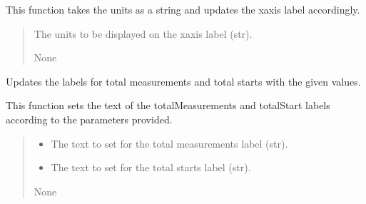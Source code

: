 \documentclass[letterpaper,10pt,english]{sphinxmanual}
\begin{document}
\begin{fulllineitems}
\begin{fulllineitems}
\sphinxAtStartPar
This function takes the units as a string and updates the x\sphinxhyphen{}axis label accordingly.
\begin{quote}\begin{description}
\sphinxAtStartPar
{} \textendash{} The units to be displayed on the x\sphinxhyphen{}axis label (str).

\sphinxAtStartPar
None

\end{description}\end{quote}

\end{fulllineitems}


\begin{fulllineitems}
\label{\detokenize{FLIMGraphics:FLIMGraphics.FLIMGraphic.updateLabels}}
\pysigstartsignatures
{}
\pysigstopsignatures
\sphinxAtStartPar
Updates the labels for total measurements and total starts with the given values.

\sphinxAtStartPar
This function sets the text of the totalMeasurements and totalStart labels 
according to the parameters provided.
\begin{quote}\begin{description}
\begin{itemize}
\item {} 
\sphinxAtStartPar
{} \textendash{} The text to set for the total measurements label (str).

\item {} 
\sphinxAtStartPar
{} \textendash{} The text to set for the total starts label (str).

\end{itemize}

\sphinxAtStartPar
None

\end{description}\end{quote}

\end{fulllineitems}


\end{fulllineitems}
\end{document}
